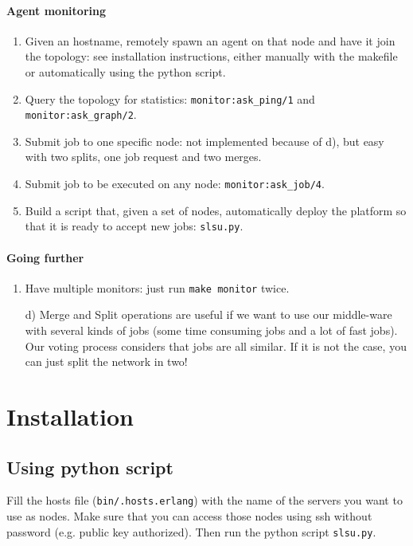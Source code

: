 \documentclass[a4paper, 11pt]{article}
\begin{document}
\paragraph{Agent monitoring}
\begin{enumerate}[label=\alph*)]
	\item Given an hostname, remotely spawn an agent on that node and have it join the topology: see installation instructions, either manually with the makefile or automatically using the python script.
	\item Query the topology for statistics: \verb|monitor:ask_ping/1| and \verb|monitor:ask_graph/2|.
	\item Submit job to one specific node: not implemented because of d), but easy with two splits, one job request and two merges. 
	\item Submit job to be executed on any node: \verb|monitor:ask_job/4|.
	\item Build a script that, given a set of nodes, automatically deploy the platform so that it is ready to accept new jobs: \verb|slsu.py|.
\end{enumerate}

\paragraph{Going further}
\begin{enumerate}[label=\alph*)]
  \item Have multiple monitors: just run \verb|make monitor| twice.
  \item[d)] Merge and Split operations are useful if we want to use our middle-ware with several kinds of jobs (some time consuming jobs and a lot of fast jobs). Our voting process considers that jobs are all similar. If it is not the case, you can just split the network in two!
\end{enumerate}

\newpage

\section{Installation}

\subsection{Using python script}

Fill the hosts file (\verb|bin/.hosts.erlang|) with the name of the servers you want to use as nodes. Make sure that you can access those nodes using ssh without password (e.g. public key authorized). Then run the python script \verb|slsu.py|.
\end{document}
